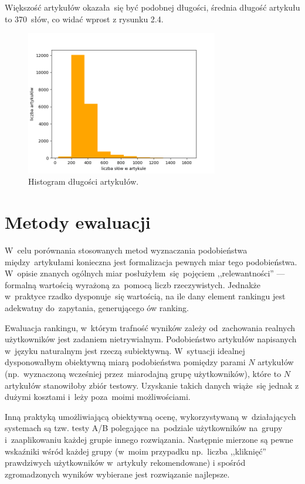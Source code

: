 \documentclass[pl]{minipw} %
\begin{document}
Większość artykułów okazała~się być podobnej długości, średnia długość artykułu to 370~słów, co widać wprost z rysunku 2.4.

\begin{figure}[H]
	\centering
	\includegraphics[width=0.75\textwidth]{img/articles_length_hist.png}
	\caption{Histogram długości artykułów.}
\end{figure}

\chapter{Metody ewaluacji}

W~celu porównania stosowanych metod wyznaczania podobieństwa między~artykułami konieczna jest formalizacja pewnych miar tego podobieństwa. W~opisie znanych ogólnych miar posłużyłem~się pojęciem ,,relewantności'' --- formalną wartością wyrażoną za~pomocą liczb rzeczywistych. Jednakże w~praktyce rzadko dysponuje~się wartością, na ile dany element rankingu jest adekwatny do~zapytania, generującego ów ranking.  

Ewaluacja rankingu, w~którym trafność wyników zależy od~zachowania realnych użytkowników jest zadaniem nietrywialnym. Podobieństwo artykułów napisanych w~języku naturalnym jest rzeczą subiektywną. W~sytuacji idealnej dysponowałbym obiektywną miarą podobieństwa pomiędzy parami $N$ artykułów (np.~wyznaczoną wcześniej przez~miarodajną grupę użytkowników), które to $N$ artykułów stanowiłoby zbiór testowy. Uzyskanie takich danych wiąże~się jednak z dużymi kosztami i~leży poza~moimi możliwościami.

Inną praktyką umożliwiającą obiektywną ocenę, wykorzystywaną w~działających systemach są tzw. testy A/B polegające na~podziale użytkowników na~grupy i~zaaplikowaniu każdej grupie innego rozwiązania. Następnie mierzone są pewne wskaźniki wśród każdej grupy (w~moim przypadku np.~liczba ,,kliknięć'' prawdziwych użytkowników w~artykuły rekomendowane) i spośród zgromadzonych wyników wybierane jest rozwiązanie najlepsze.
\end{document}
